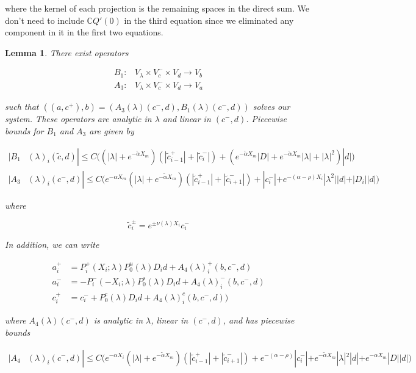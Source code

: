 \documentclass[12pt]{article}
\def\C{{\mathbb C}}
\newtheorem{lemma}{Lemma}
\begin{document}
where the kernel of each projection is the remaining spaces in the direct sum. We don't need to include $\C Q'(0)$ in the third equation since we eliminated any component in it in the first two equations.


\begin{lemma}\label{inv2}
There exist operators

\begin{align*}
B_1: &V_\lambda \times V_c^- \times V_d \rightarrow V_b \\
A_3: &V_\lambda \times V_c^- \times V_d \rightarrow V_a 
\end{align*}

such that $( (a, c^+) , b ) = ( A_3(\lambda)(c^-,d), B_1(\lambda)(c^-, d) )$ solves our system. These operators are analytic in $\lambda$ and linear in $(c^-,d)$. Piecewise bounds for $B_1$ and $A_3$ are given by

\begin{align}
|B_1&(\lambda)_i(\tilde{c}, d)| \leq C\Big( 
(|\lambda| + e^{-\tilde{\alpha}X_m})( |\tilde{c}_{i-1}^+| + |\tilde{c}_i^-|) + ( e^{-\tilde{\alpha}X_m} |D| + e^{-\tilde{\alpha}X_m}|\lambda| + |\lambda|^2)|d| \Big) \\
|A_3&(\lambda)_i(c^-, d)|
\leq C \Big(  
e^{-\alpha X_m} (|\lambda| + e^{-\tilde{\alpha}X_m})(|\tilde{c}_{i-1}^+| + |\tilde{c}_{i+1}^-|) +|c_i^-| + e^{-(\alpha - \rho) X_i} |\lambda^2||d| + |D_i||d| \Big)
\end{align} 

where

\begin{equation}\label{tildec}
\tilde{c}_i^\pm = e^{\pm \nu(\lambda) X_i} c_i^-
\end{equation}

In addition, we can write

\begin{align*}
a_i^+ &= P_i^+(X_i; \lambda) P_0^u(\lambda) D_i d + A_4(\lambda)_i^+(b, c^-, d) \\
a_i^- &= -P_i^-(-X_i; \lambda) P_0^s(\lambda) D_i d + A_4(\lambda)_i^-(b, c^-, d) \\
c_i^+ &= c_i^- + P_0^c(\lambda) D_i d + A_4(\lambda)_i^c(b, c^-, d) )
\end{align*}

where $A_4(\lambda)(c^-, d)$ is analytic in $\lambda$, linear in $(c^-, d)$, and has piecewise bounds

\begin{align}
|A_4&(\lambda)_i(c^-, d)|
\leq C \Big( 
e^{-\alpha X_i} (|\lambda| + e^{-\tilde{\alpha}X_m})(|\tilde{c}_{i-1}^+| + |\tilde{c}_{i+1}^-|) + e^{-(\alpha - \rho) } |c_i^-| + e^{-\tilde{\alpha} X_m} |\lambda|^2|d| + e^{-\alpha X_m}|D||d| \Big)
\end{align}


\end{lemma}
\end{document}
